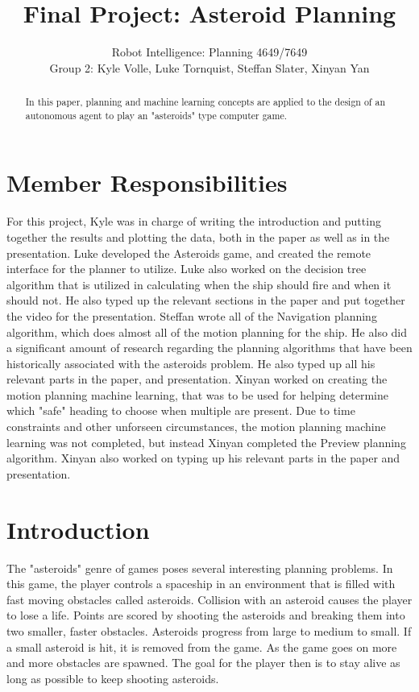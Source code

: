 \documentclass[10pt,draft,conference]{IEEEtran}
\begin{document}
\title{Final Project: Asteroid Planning}
\author{Robot Intelligence: Planning 4649/7649 \\
Group 2: Kyle Volle, Luke Tornquist, Steffan Slater, Xinyan Yan}
\maketitle


\newpage

\nocite{*}

\begin{abstract}
In this paper, planning and machine learning concepts are applied to the design of an autonomous agent to play an "asteroids" type computer game. 
\end{abstract}

\section{Member Responsibilities}
For this project, Kyle was in charge of writing the introduction and putting together the results and plotting the data, both in the paper as well as in the presentation.  Luke developed the Asteroids game, and created the remote interface for the planner to utilize.  Luke also worked on the decision tree algorithm that is utilized in calculating when the ship should fire and when it should not.  He also typed up the relevant sections in the paper and put together the video for the presentation.  Steffan wrote all of the Navigation planning algorithm, which does almost all of the motion planning for the ship.  He also did a significant amount of research regarding the planning algorithms that have been historically associated with the asteroids problem.  He also typed up all his relevant parts in the paper, and presentation.  Xinyan worked on creating the motion planning machine learning, that was to be used for helping determine which "safe" heading to choose when multiple are present.  Due to time constraints and other unforseen circumstances, the motion planning machine learning was not completed, but instead Xinyan completed the Preview planning algorithm.  Xinyan also worked on typing up his relevant parts in the paper and presentation.

\section{Introduction}
The "asteroids" genre of games poses several interesting planning problems. In this game, the player controls a spaceship in an environment that is filled with fast moving obstacles called asteroids. Collision with an asteroid causes the player to lose a life. Points are scored by shooting the asteroids and breaking them into two smaller, faster obstacles. Asteroids progress from large to medium to small. If a small asteroid is hit, it is removed from the game. As the game goes on more and more obstacles are spawned. The goal for the player then is to stay alive as long as possible to keep shooting asteroids.
\end{document}
